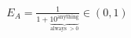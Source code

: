 \documentclass[preview]{standalone}
\begin{document}
\begin{align*}
E_A = \frac{1}{1 + \underbrace{10^{\text{anything}}}_{\text{always } > 0}} \in (0, 1)
\end{align*}
\end{document}
